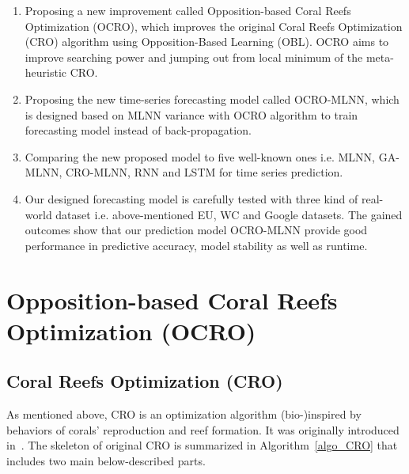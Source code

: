 \documentclass[review,3p,authoryear]{elsarticle}
\begin{document}
\begin{enumerate}
	\item Proposing a new improvement called Opposition-based Coral Reefs Optimization (OCRO), which improves the original Coral Reefs Optimization (CRO) algorithm using Opposition-Based Learning (OBL). OCRO aims to improve searching power and jumping out from local minimum of the meta-heuristic CRO.
	\item Proposing the new time-series forecasting model called OCRO-MLNN, which is designed based on MLNN variance with OCRO algorithm to train forecasting model instead of back-propagation. 
	\item Comparing the new proposed model to five well-known ones i.e. MLNN, GA-MLNN, CRO-MLNN, RNN and LSTM for time series prediction.
	\item Our designed forecasting model is carefully tested with three kind of real-world dataset i.e. above-mentioned EU, WC and Google datasets. The gained outcomes show that our prediction model OCRO-MLNN provide good performance in predictive accuracy, model stability as well as runtime.
\end{enumerate}

\section{Opposition-based Coral Reefs Optimization (OCRO)}
\label{ocro_mlnn}
\subsection{Coral Reefs Optimization (CRO)}
\label{cro}

As mentioned above, CRO is an optimization algorithm (bio-)inspired by behaviors of corals’ reproduction and reef formation. It was originally introduced in~\citep{ref_salcedo_sanz1}. The skeleton of original CRO is summarized in Algorithm~\ref{algo_CRO} that includes two main below-described parts.\\
\end{document}
